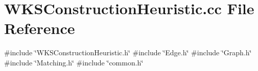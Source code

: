 \section{W\+K\+S\+Construction\+Heuristic.\+cc File Reference}
\label{WKSConstructionHeuristic_8cc}
{\ttfamily \#include \char`\"{}W\+K\+S\+Construction\+Heuristic.\+h\char`\"{}}\newline
{\ttfamily \#include \char`\"{}Edge.\+h\char`\"{}}\newline
{\ttfamily \#include \char`\"{}Graph.\+h\char`\"{}}\newline
{\ttfamily \#include \char`\"{}Matching.\+h\char`\"{}}\newline
{\ttfamily \#include \char`\"{}common.\+h\char`\"{}}\newline
